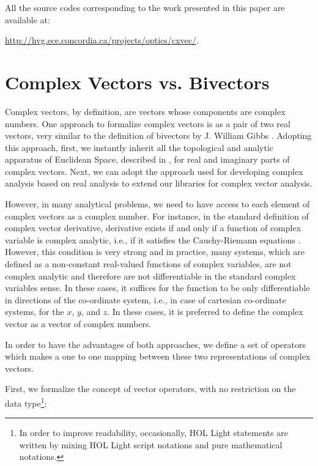 \documentclass{llncs}
\begin{document}
All the source codes corresponding to the work presented in this paper 
are available at:  {\url{http://hvg.ece.concordia.ca/projects/optics/cxvec/}.



\section{Complex Vectors vs. Bivectors}
\label{sec:operators}
Complex vectors, by definition, are vectors whose components are complex numbers. 
One approach to formalize complex vectors is as a pair of two real vectors, very similar to the definition of bivectors by J. William Gibbs \cite{gibbs_1884}. 
Adopting this approach, first, we instantly inherit all the topological and analytic apparatus of Euclidean Space, described in \cite{harrison_13hol}, for real and imaginary parts of complex vectors. Next, we can adopt the approach used for developing complex analysis based on real analysis \cite{harrison_07} to extend our libraries for complex vector analysis. 

However, in many analytical problems, we need to have access to each element of complex vectors as a complex number. For instance, in the standard definition of complex vector derivative, derivative exists if and only if a function of complex variable is  complex analytic, i.e., if it satisfies the Cauchy-Riemann equations \cite{LePage_80}.  However, this condition is very strong and in practice, many systems, which are defined as a non-constant real-valued functions of complex variables, are not complex analytic and therefore are not differentiable in the standard complex variables sense. In these cases, it suffices for the function to be only differentiable in directions of the co-ordinate system, i.e., in case of cartesian co-ordinate systems, for the $x$, $y$, and $z$. In these cases, it is preferred to define the complex vector as a vector of complex numbers.

In order to have the advantages of both approaches, we define a set of operators which makes a one to one mapping between these two representations of complex vectors.

First, we formalize the concept of vector operators, with no restriction on the data type\footnote{ In order to improve readability, occasionally, HOL Light statements are written by mixing HOL Light script notations and pure mathematical notations.}:

}
\end{document}
